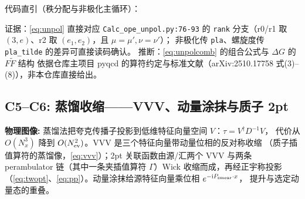 \documentclass[UTF8]{ctexart}
\begin{document}
代码直引（秩分配与非极化主循环）：



\textcolor{evidence}{证据}：\eqref{eq:unpol} 直接对应 \texttt{Calc\_ope\_unpol.py:76-93} 的
\texttt{rank} 分支（r0/r1 取 $(3,e)$、r2 取 $(e_1,e_2)$，且 $\mu=\mu',\nu=\nu'$）；
非极化传 \texttt{pla}、螺旋度传 \texttt{pla\_tilde} 的差异可直接读码确认。
\textcolor{phys}{推断}：\eqref{eq:unpolcomb} 的组合公式与 $\Delta G$ 的 $F\widetilde F$ 结构
依据仓库主项目 pyqcd 的算符约定与标准文献（arXiv:2510.17758 式(3)--(8)），非本仓库直接给出。

\subsection{C5--C6: 蒸馏收缩——VVV、动量涂抹与质子 2pt}
\begin{physbox}
\textbf{物理图像:} 蒸馏法把夸克传播子投影到低维特征向量空间 $V$：$\tau = V^\dagger D^{-1}V$，
代价从 $O(N_x^3)$ 降到 $O(N_{\rm ev}^2)$。VVV 是三个特征向量带动量位相的反对称收缩
（质子插值算符的蒸馏像，\eqref{eq:vvv}）；2pt 关联函数由源/汇两个 VVV 与两条
perambulator 链（其中一条夹插值算符 $\Gamma$）Wick 收缩而成，再经正宇称投影
（\eqref{eq:twopt}、\eqref{eq:pp}）。动量涂抹给源特征向量乘位相 $e^{-\mathrm i P_{\rm smear}\cdot x}$，
提升与选定动量态的重叠。
\end{physbox}
\end{document}
